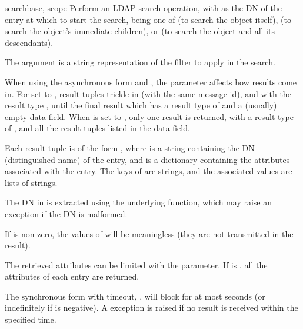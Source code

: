 
\begin{methoddesc}[LDAP]{search}{base, scope } %
Perform an LDAP search operation, with  as the DN of the entry
at which to start the search,  being one of 
 (to search the object itself), 
 (to search the object's immediate children), or
 (to search the object and all its descendants).

The
 argument is a string representation of the filter to apply in
the search.

\begin{seealso}
\end{seealso}

When using the asynchronous form and , the 
parameter affects how results come in.
For  set to , 
result tuples trickle in (with the same message id), and with the result
type , until the final result which has 
a result type of  and a (usually) empty data field.
When  is set to , only one result is returned, with a
result type of , and all the result tuples listed 
in the data field.

Each result tuple is of the form , 
where  is a string containing
the DN (distinguished name) of the entry, and 
 is a dictionary
containing the attributes associated with the entry. 
The keys of  are strings, 
and the associated values are lists of strings.

The DN in  is extracted using the underlying 
function,
which may raise an exception if the DN is malformed.

If  is non-zero, the values of  will be meaningless
(they are not transmitted in the result).

The retrieved attributes can be limited with the  parameter.
If  is , all the attributes of each entry are returned.

The synchronous form with timeout, , will block for at most
 seconds (or indefinitely if  is negative). A
 exception is raised if no result is received within the
specified time.
\end{methoddesc}

